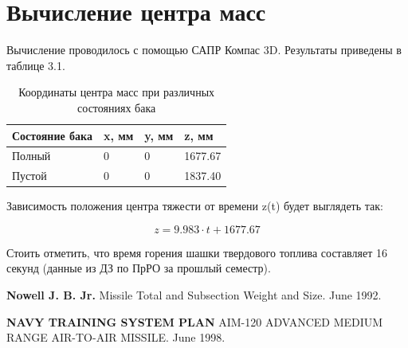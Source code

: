 \documentclass[a4paper,12pt]{report}
\begin{document}
\section{Вычисление центра масс}

Вычисление проводилось с помощью САПР Компас 3D. Результаты приведены в таблице 3.1.

\begin{table}[h]
\centering
\begin{tabular}{|p{}|p{}|p{}|p{}|}
\hline
\textbf{Состояние бака} & \textbf{x, мм} & \textbf{y, мм} & \textbf{z, мм} \\
\hline
Полный & 0 & 0 & 1677.67 \\
\hline
Пустой & 0 & 0 & 1837.40 \\
\hline
\end{tabular}
\caption{Координаты центра масс при различных состояниях бака}
\label{tab:four_columns}
\end{table}

Зависимость положения центра тяжести от времени z(t) будет выглядеть так: 

\[z = 9.983\cdot t + 1677.67 \]

Стоить отметить, что время горения шашки твердового топлива составляет 16 секунд (данные из ДЗ по ПрРО за прошлый семестр).
\newpage
\begin{thebibliography}{9}

\bibitem{} \textbf{Nowell J. B. Jr.} Missile Total and Subsection Weight and Size. June 1992.

\bibitem{} \textbf{NAVY TRAINING SYSTEM PLAN} AIM-120 ADVANCED MEDIUM RANGE
 AIR-TO-AIR MISSILE. June 1998.

\end{thebibliography}
\end{document}
